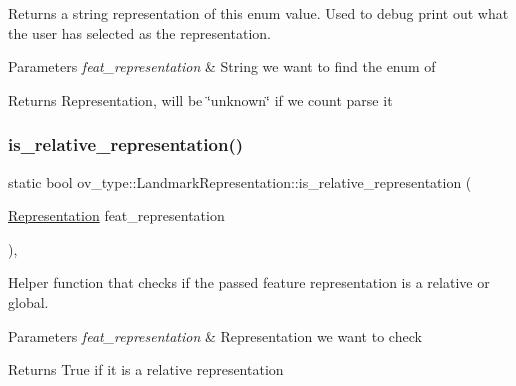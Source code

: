Returns a string representation of this enum value. Used to debug print out what the user has selected as the representation. 


\begin{DoxyParams}{Parameters}
{\em feat\+\_\+representation} & String we want to find the enum of \\
\hline
\end{DoxyParams}
\begin{DoxyReturn}{Returns}
Representation, will be \char`\"{}unknown\char`\"{} if we coun\textquotesingle{}t parse it 
\end{DoxyReturn}
\mbox{\label{classov__type_1_1LandmarkRepresentation_a67860ca8360c71fa8c1ae3f99a2378c1}} 
\subsubsection{\texorpdfstring{is\+\_\+relative\+\_\+representation()}{is\_relative\_representation()}}
{\footnotesize\ttfamily static bool ov\+\_\+type\+::\+Landmark\+Representation\+::is\+\_\+relative\+\_\+representation (\begin{DoxyParamCaption}\item[{\hyperlink{classov__type_1_1LandmarkRepresentation_a7f5783df6932ace7f098ae243b6d298e}{Representation}}]{feat\+\_\+representation }\end{DoxyParamCaption})\hspace{0.3cm}{\ttfamily [inline]}, {\ttfamily [static]}}



Helper function that checks if the passed feature representation is a relative or global. 


\begin{DoxyParams}{Parameters}
{\em feat\+\_\+representation} & Representation we want to check \\
\hline
\end{DoxyParams}
\begin{DoxyReturn}{Returns}
True if it is a relative representation 
\end{DoxyReturn}
